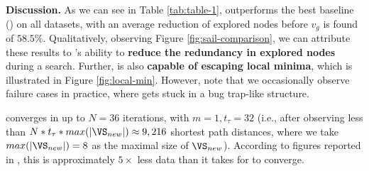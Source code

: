 
\textbf{Discussion.} As we can see in Table \ref{tab:table-1}, \phil outperforms the best baseline (\textit{\sail}) on all datasets, with an average reduction of explored nodes before $v_g$ is found of $58.5 \%$.
Qualitatively, observing Figure \ref{fig:sail-comparison}, we can attribute these results to \phil's ability to \textbf{reduce the redundancy in explored nodes} during a search. Further, \phil is also \textbf{capable of escaping local minima}, which is illustrated in Figure \ref{fig:local-min}. However, note that we occasionally observe failure cases in practice, where \phil gets stuck in a bug trap-like structure.

 \phil converges in up to $N = 36$ iterations, with $m = 1, t_\tau = 32$ (i.e., after observing less than $N * t_\tau * max(|\VS_{new}|) \approx 9,216$ shortest path distances, where we take $max(|\VS_{new}|) = 8$ as the maximal size of $\VS_{new}$). According to figures reported in \cite{bhardwaj2017learning}, this is approximately $5\times$ less data than it takes for \sail to converge.



